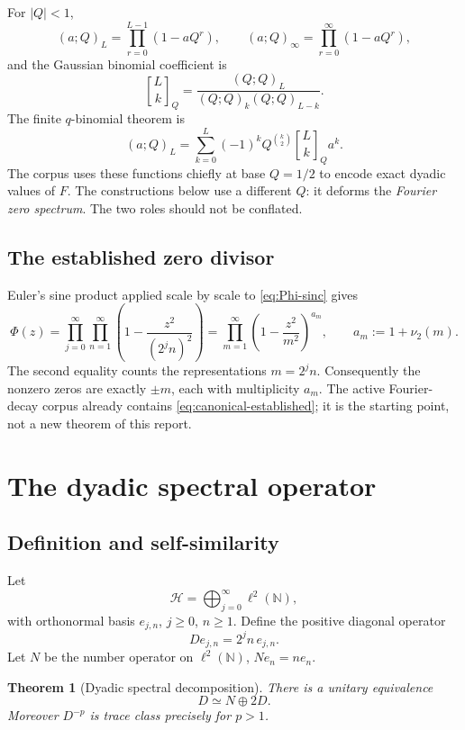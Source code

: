 \documentclass[11pt,oneside]{article}
\numberwithin{equation}{section}
\theoremstyle{plain}
\newtheorem{theorem}{Theorem}[section]
\theoremstyle{definition}
\theoremstyle{remark}
\newcommand{\N}{\mathbb N}
\newcommand{\Hh}{\mathcal H}
\newcommand{\qbinom}[3]{\genfrac{[}{]}{0pt}{}{#1}{#2}_{#3}}
\begin{document}
For $|Q|<1$,
\[
 (a;Q)_L=\prod_{r=0}^{L-1}(1-aQ^r),
 \qquad
 (a;Q)_\infty=\prod_{r=0}^{\infty}(1-aQ^r),
\]
and the Gaussian binomial coefficient is
\[
 \qbinom{L}{k}{Q}=\frac{(Q;Q)_L}{(Q;Q)_k(Q;Q)_{L-k}}.
\]
The finite $q$-binomial theorem is
\begin{equation}\label{eq:q-binomial}
 (a;Q)_L=\sum_{k=0}^{L}(-1)^kQ^{\binom{k}{2}}
 \qbinom{L}{k}{Q}a^k.
\end{equation}
The corpus uses these functions chiefly at base $Q=1/2$ to encode exact dyadic values of $F$.  The constructions below use a different $Q$: it deforms the \emph{Fourier zero spectrum}.  The two roles should not be conflated.

\subsection{The established zero divisor}

Euler's sine product applied scale by scale to \cref{eq:Phi-sinc} gives
\begin{equation}\label{eq:canonical-established}
 \Phi(z)=\prod_{j=0}^{\infty}\prod_{n=1}^{\infty}
 \left(1-\frac{z^2}{(2^jn)^2}\right)
 =\prod_{m=1}^{\infty}
 \left(1-\frac{z^2}{m^2}\right)^{a_m},
 \qquad a_m:=1+\nu_2(m).
\end{equation}
The second equality counts the representations $m=2^jn$.  Consequently the nonzero zeros are exactly $\pm m$, each with multiplicity $a_m$.  The active Fourier-decay corpus already contains \cref{eq:canonical-established}; it is the starting point, not a new theorem of this report.

\section{The dyadic spectral operator}

\subsection{Definition and self-similarity}

Let
\[
 \Hh=\bigoplus_{j=0}^{\infty}\ell^2(\N),
\]
with orthonormal basis $e_{j,n}$, $j\ge0$, $n\ge1$.  Define the positive diagonal operator
\begin{equation}\label{eq:D-def}
 De_{j,n}=2^jn\,e_{j,n}.
\end{equation}
Let $N$ be the number operator on $\ell^2(\N)$, $Ne_n=ne_n$.

\begin{theorem}[Dyadic spectral decomposition]\label{thm:D-decomp}
There is a unitary equivalence
\begin{equation}\label{eq:D-decomp}
 D\simeq N\oplus2D.
\end{equation}
Moreover $D^{-p}$ is trace class precisely for $p>1$.
\end{theorem}
\end{document}
